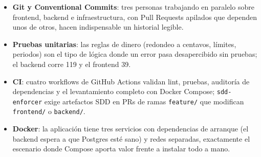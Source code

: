 \begin{itemize}
    \item \textbf{Git y Conventional Commits}: tres personas trabajando en paralelo sobre frontend, backend e infraestructura, con Pull Requests apilados que dependen unos de otros, hacen indispensable un historial legible.
    \item \textbf{Pruebas unitarias}: las reglas de dinero (redondeo a centavos, límites, periodos) son el tipo de lógica donde un error pasa desapercibido sin pruebas; el backend corre 119 y el frontend 39.
    \item \textbf{CI}: cuatro workflows de GitHub Actions validan lint, pruebas, auditoría de dependencias y el levantamiento completo con Docker Compose; \texttt{sdd-enforcer} exige artefactos SDD en PRs de ramas \texttt{feature/} que modifican \texttt{frontend/} o \texttt{backend/}.
    \item \textbf{Docker}: la aplicación tiene tres servicios con dependencias de arranque (el backend espera a que Postgres esté sano) y redes separadas, exactamente el escenario donde Compose aporta valor frente a instalar todo a mano.
\end{itemize}
